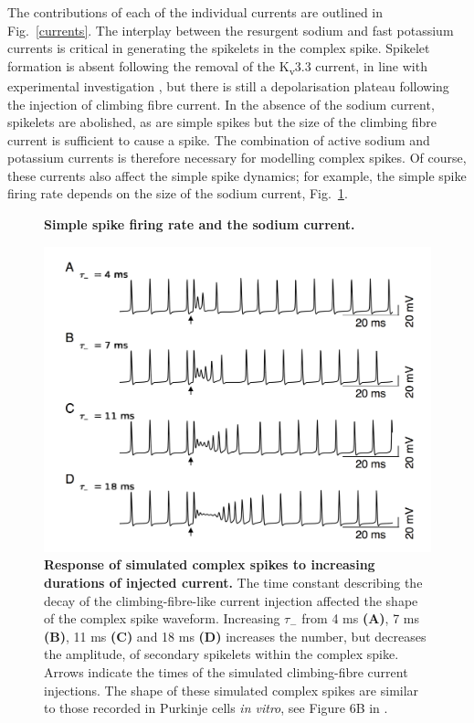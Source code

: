 \documentclass[twocolumn]{svjour3}          %
\begin{document}
The contributions of each of the individual currents are outlined in
Fig.~\ref{currents}.  The interplay between the resurgent sodium and
fast potassium currents is critical in generating the spikelets in the
complex spike. Spikelet formation is absent following the removal of
the K\textsubscript{v}3.3 current, in line with experimental
investigation \citep{ZaghaEtAl2010}, but there is still a
depolarisation plateau following the injection of climbing fibre
current. In the absence of the sodium current, spikelets are
abolished, as are simple spikes but the size of the climbing fibre
current is sufficient to cause a spike. The combination of active
sodium and potassium currents is therefore necessary for modelling
complex spikes. Of course, these currents also affect the simple spike
dynamics; for example, the simple spike firing rate depends on the
size of the sodium current, Fig.~\ref{fig:ss_v_grna}.


\begin{figure}[!ht]
  
\caption{\textbf{Simple spike firing rate and the sodium current.}} 
\label{fig:ss_v_grna}
\end{figure}





\begin{figure}[!ht]
  \includegraphics[width=\linewidth]{Figure4.png}
\caption{\textbf {Response of simulated complex spikes to increasing
    durations of injected current.} The time constant describing the
  decay of the climbing-fibre-like current injection affected the
  shape of the complex spike waveform. Increasing $\tau_-$ from 4 ms
  \textbf{(A)}, 7 ms \textbf{(B)}, 11 ms \textbf{(C)} and 18 ms
  \textbf{(D)} increases the number, but decreases the amplitude, of
  secondary spikelets within the complex spike. Arrows indicate the times
  of the simulated climbing-fibre current injections. The shape of
  these simulated complex spikes are similar to those recorded in
  Purkinje cells \textit{in vitro}, see Figure 6B in
  \protect\citet{MonsivaisEtAl2005}.
\label{fig:injection_durations}}
\end{figure}
\end{document}
